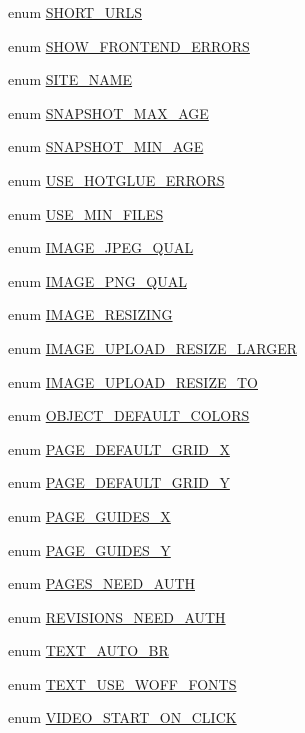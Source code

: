 \begin{DoxyCompactItemize}
\item 
enum \hyperlink{config_8inc_8php_a377ac3321785e25215435e8d9802bc34}{SHORT\_\-URLS} 
\item 
enum \hyperlink{config_8inc_8php_a71022f94adb600e3984795805fe7f8d0}{SHOW\_\-FRONTEND\_\-ERRORS} 
\item 
enum \hyperlink{config_8inc_8php_a38f8e1265350d7091b55f4cffe629f3a}{SITE\_\-NAME} 
\item 
enum \hyperlink{config_8inc_8php_aa9c8d739795b1000f6ea105992a4e488}{SNAPSHOT\_\-MAX\_\-AGE} 
\item 
enum \hyperlink{config_8inc_8php_a7fb94ff6aaa61e964fe2f90f738d5cb3}{SNAPSHOT\_\-MIN\_\-AGE} 
\item 
enum \hyperlink{config_8inc_8php_a4be2ca4abd0486feb76708f3cf7e671d}{USE\_\-HOTGLUE\_\-ERRORS} 
\item 
enum \hyperlink{config_8inc_8php_a98806af9de0ea41a958d26c7e06b26a9}{USE\_\-MIN\_\-FILES} 
\item 
enum \hyperlink{config_8inc_8php_af27e0280ef96e9b1d2d968a0d2d208ff}{IMAGE\_\-JPEG\_\-QUAL} 
\item 
enum \hyperlink{config_8inc_8php_a3e161cc5c717f2e23d89b69ec297af9b}{IMAGE\_\-PNG\_\-QUAL} 
\item 
enum \hyperlink{config_8inc_8php_a0654894e46ca07417a6e85e091ed7d1d}{IMAGE\_\-RESIZING} 
\item 
enum \hyperlink{config_8inc_8php_a009a803b2fcec74eb8fd6b90dfebd680}{IMAGE\_\-UPLOAD\_\-RESIZE\_\-LARGER} 
\item 
enum \hyperlink{config_8inc_8php_a86484d4f8051155268e7c23ac4d1f5f4}{IMAGE\_\-UPLOAD\_\-RESIZE\_\-TO} 
\item 
enum \hyperlink{config_8inc_8php_a3e205a45d91d7ef191e53487b6b48b3b}{OBJECT\_\-DEFAULT\_\-COLORS} 
\item 
enum \hyperlink{config_8inc_8php_abc1c54acdbce897c718854b663517cf9}{PAGE\_\-DEFAULT\_\-GRID\_\-X} 
\item 
enum \hyperlink{config_8inc_8php_ab93c5dcea5ef58747b80594c3d9304d7}{PAGE\_\-DEFAULT\_\-GRID\_\-Y} 
\item 
enum \hyperlink{config_8inc_8php_a81167deb206874270a59273141919fe5}{PAGE\_\-GUIDES\_\-X} 
\item 
enum \hyperlink{config_8inc_8php_a3f78eb981e05f649bfff403c0e595d0b}{PAGE\_\-GUIDES\_\-Y} 
\item 
enum \hyperlink{config_8inc_8php_a11f5534165e1764860b16cc7215b2141}{PAGES\_\-NEED\_\-AUTH} 
\item 
enum \hyperlink{config_8inc_8php_a67b9479d334a4e6c33c0bc3505b3eb5e}{REVISIONS\_\-NEED\_\-AUTH} 
\item 
enum \hyperlink{config_8inc_8php_a6f581226f389510394c592491ebedc0b}{TEXT\_\-AUTO\_\-BR} 
\item 
enum \hyperlink{config_8inc_8php_aca83853e44d4952801b133bf687a1056}{TEXT\_\-USE\_\-WOFF\_\-FONTS} 
\item 
enum \hyperlink{config_8inc_8php_ae1e42e1baa41f003453356a3747f9fee}{VIDEO\_\-START\_\-ON\_\-CLICK} 
\end{DoxyCompactItemize}
